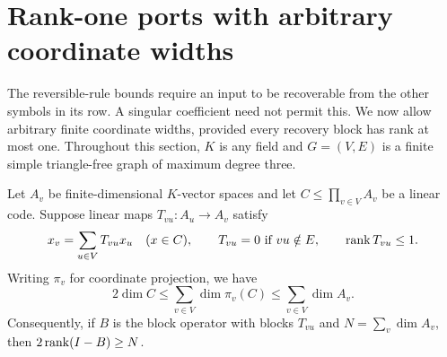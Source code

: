\section{Rank-one ports with arbitrary coordinate widths}\label{sec:rank-one}
The reversible-rule bounds require an input to be recoverable from the
other symbols in its row. A singular coefficient need not permit this.
We now allow arbitrary finite coordinate widths, provided every recovery
block has rank at most one. Throughout this section, $K$ is any field and
$G=(V,E)$ is a finite simple triangle-free graph of maximum degree three.

\begin{theorem}\label{thm:rank-one}
Let $A_v$ be finite-dimensional $K$-vector spaces and let
$C\leq\prod_{v\in V}A_v$ be a linear code. Suppose linear maps
$T_{vu}:A_u\to A_v$ satisfy
\[
 x_v=\sum_{u\in V}T_{vu}x_u\quad(x\in C),\qquad
 T_{vu}=0\text{ if }vu\notin E,\qquad \operatorname{rank} T_{vu}\leq1.
\]
Writing $\pi_v$ for coordinate projection, we have
\[
 2\dim C\leq\sum_{v\in V}\dim\pi_v(C)\leq\sum_{v\in V}\dim A_v.
\]
Consequently, if $B$ is the block operator with blocks $T_{vu}$ and
$N=\sum_v\dim A_v$, then $2\operatorname{rank}(I-B)\geq N$.
\end{theorem}

